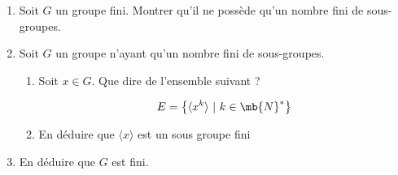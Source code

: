 
\begin{enumerate}

\item Soit $G$ un groupe fini. Montrer qu'il ne possède qu'un nombre fini de sous-groupes.

\item Soit $G$ un groupe n'ayant qu'un nombre fini de sous-groupes.

\begin{enumerate}

\item Soit $x \in G$. 
    Que dire de l'ensemble suivant ?

    \begin{equation*}
        E = \left\{ \langle x^k \rangle ~|~ k \in \mb{N}^*  \right\}
    \end{equation*}

\item En déduire que $\langle x \rangle$ est un sous groupe fini

\end{enumerate}

\item En déduire que $G$ est fini.

\end{enumerate}


